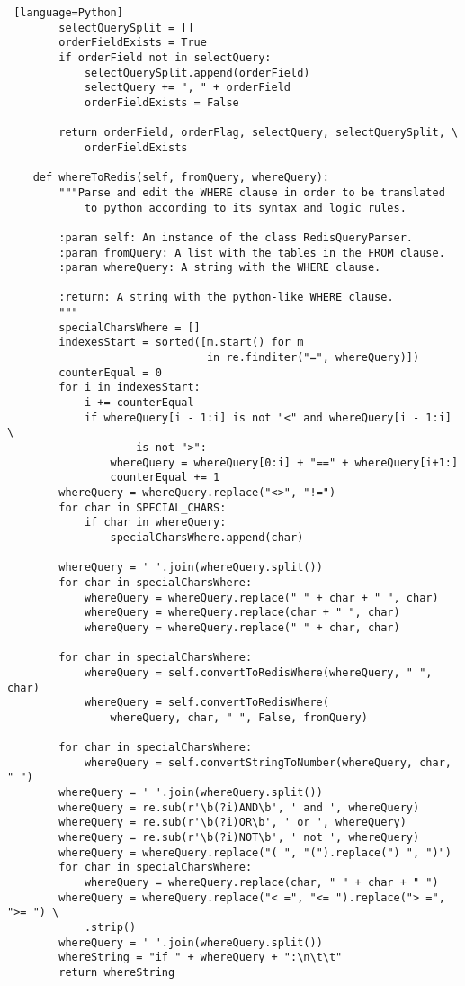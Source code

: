 \documentclass[11pt]{article}
\begin{document}
\begin{lstlisting} [language=Python]
        selectQuerySplit = []
        orderFieldExists = True
        if orderField not in selectQuery:
            selectQuerySplit.append(orderField)
            selectQuery += ", " + orderField
            orderFieldExists = False

        return orderField, orderFlag, selectQuery, selectQuerySplit, \
            orderFieldExists

    def whereToRedis(self, fromQuery, whereQuery):
        """Parse and edit the WHERE clause in order to be translated
            to python according to its syntax and logic rules.

        :param self: An instance of the class RedisQueryParser.
        :param fromQuery: A list with the tables in the FROM clause.
        :param whereQuery: A string with the WHERE clause.

        :return: A string with the python-like WHERE clause.
        """
        specialCharsWhere = []
        indexesStart = sorted([m.start() for m
                               in re.finditer("=", whereQuery)])
        counterEqual = 0
        for i in indexesStart:
            i += counterEqual
            if whereQuery[i - 1:i] is not "<" and whereQuery[i - 1:i] \
                    is not ">":
                whereQuery = whereQuery[0:i] + "==" + whereQuery[i+1:]
                counterEqual += 1
        whereQuery = whereQuery.replace("<>", "!=")
        for char in SPECIAL_CHARS:
            if char in whereQuery:
                specialCharsWhere.append(char)

        whereQuery = ' '.join(whereQuery.split())
        for char in specialCharsWhere:
            whereQuery = whereQuery.replace(" " + char + " ", char)
            whereQuery = whereQuery.replace(char + " ", char)
            whereQuery = whereQuery.replace(" " + char, char)

        for char in specialCharsWhere:
            whereQuery = self.convertToRedisWhere(whereQuery, " ", char)
            whereQuery = self.convertToRedisWhere(
                whereQuery, char, " ", False, fromQuery)

        for char in specialCharsWhere:
            whereQuery = self.convertStringToNumber(whereQuery, char, " ")
        whereQuery = ' '.join(whereQuery.split())
        whereQuery = re.sub(r'\b(?i)AND\b', ' and ', whereQuery)
        whereQuery = re.sub(r'\b(?i)OR\b', ' or ', whereQuery)
        whereQuery = re.sub(r'\b(?i)NOT\b', ' not ', whereQuery)
        whereQuery = whereQuery.replace("( ", "(").replace(") ", ")")
        for char in specialCharsWhere:
            whereQuery = whereQuery.replace(char, " " + char + " ")
        whereQuery = whereQuery.replace("< =", "<= ").replace("> =", ">= ") \
            .strip()
        whereQuery = ' '.join(whereQuery.split())
        whereString = "if " + whereQuery + ":\n\t\t"
        return whereString


\end{lstlisting}
\end{document}
